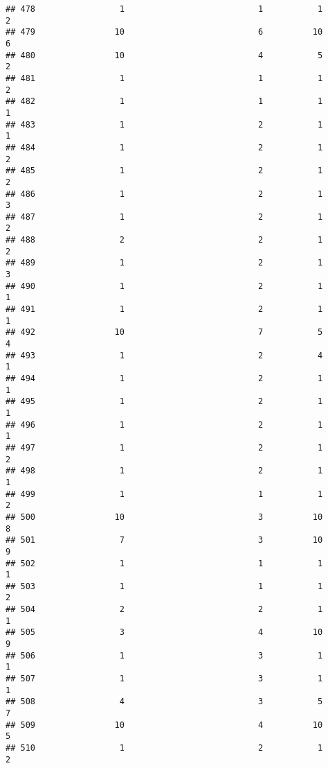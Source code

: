 \documentclass[
]{article}
\begin{document}
\begin{verbatim}
## 478                 1                           1           1               2
## 479                10                           6          10               6
## 480                10                           4           5               2
## 481                 1                           1           1               2
## 482                 1                           1           1               1
## 483                 1                           2           1               1
## 484                 1                           2           1               2
## 485                 1                           2           1               2
## 486                 1                           2           1               3
## 487                 1                           2           1               2
## 488                 2                           2           1               2
## 489                 1                           2           1               3
## 490                 1                           2           1               1
## 491                 1                           2           1               1
## 492                10                           7           5               4
## 493                 1                           2           4               1
## 494                 1                           2           1               1
## 495                 1                           2           1               1
## 496                 1                           2           1               1
## 497                 1                           2           1               2
## 498                 1                           2           1               1
## 499                 1                           1           1               2
## 500                10                           3          10               8
## 501                 7                           3          10               9
## 502                 1                           1           1               1
## 503                 1                           1           1               2
## 504                 2                           2           1               1
## 505                 3                           4          10               9
## 506                 1                           3           1               1
## 507                 1                           3           1               1
## 508                 4                           3           5               7
## 509                10                           4          10               5
## 510                 1                           2           1               2

\end{verbatim}
\end{document}
